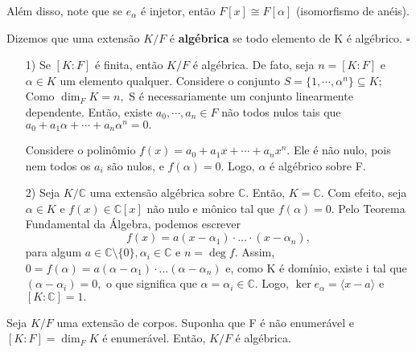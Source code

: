 \documentclass[AlgebraII/algebraII_notes.tex]{subfiles}
\begin{document}
Além disso, note que se \(e_{\alpha }\) é injetor, então \(F[x]\cong{F[\alpha ]}\) (isomorfismo de anéis).
\begin{def*}
	Dizemos que uma extensão \(K/F\) é \textbf{algébrica} se todo elemento de K é algébrico. \(\square\)
\end{def*}
\begin{example}
	\begin{itemize}
		\item[1)] Se \([K:F]\) é finita, então \(K/F\) é algébrica. De fato, seja \(n=[K:F]\) e \(\alpha \in K\) um elemento qualquer.
		      Considere o conjunto \(S = \{1, \cdots, \alpha ^{n}\}\subseteq{K};\) Como \(\dim_{F}K = n,\) S é necessariamente um conjunto linearmente
		      dependente. Então, existe \(a_{0}, \cdots, a_{n}\in F\) não todos nulos tais que \(a_{0} + a_{1}\alpha + \cdots + a_{n}\alpha^{n} = 0.\)

		      Considere o polinômio \(f(x) = a_{0}+a_{1}x + \cdots + a_{n}x^{n}.\) Ele é não nulo, pois nem todos os \(a_{i}\) são nulos,
		      e \(f(\alpha ) = 0\). Logo, \(\alpha \) é algébrico sobre F.

		\item[2)] Seja \(K/\mathbb{C}\) uma extensão algébrica sobre \(\mathbb{C}.\) Então, \(K = \mathbb{C}.\) Com efeito, seja \(\alpha \in K\)
		      e \(f(x)\in \mathbb{C}[x]\) não nulo e mônico tal que \(f(\alpha ) = 0\). Pelo Teorema Fundamental da Álgebra, podemos escrever
		      \[
			      f(x) = a(x-\alpha_{1})\cdot \dotsc \cdot (x-\alpha_{n}),
		      \]
		      para algum \(a\in \mathbb{C}\setminus{\{0\}},\alpha_{i}\in \mathbb{C}\) e \(n = \deg{f}.\) Assim, \(0 = f(\alpha ) = a(\alpha -\alpha_{1})\cdot \dotsc(\alpha -\alpha_{n})\)
		      e, como K é domínio, existe i tal que \((\alpha -\alpha_{i})=0,\) o que significa que \(\alpha=\alpha_{i}\in \mathbb{C}.\) Logo, \(\ker{e_{\alpha }}=\langle x-a \rangle\) e \([K:\mathbb{C}] = 1.\)
	\end{itemize}
\end{example}
\begin{prop*}
	Seja \(K/F\) uma extensão de corpos. Suponha que F é não enumerável e \([K:F]=\dim_{F}K\) é enumerável. Então,
	\(K/F\) é algébrica.
\end{prop*}
\end{document}

